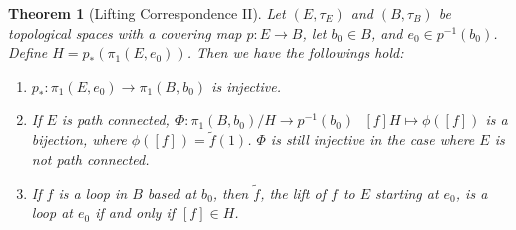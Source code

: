 \documentclass[11pt]{book}
\theoremstyle{break}
\theoremstyle{break}
\newtheorem{thm}{Theorem}[section]
\newcommand{\that}[1]{\widetilde{#1}}
\begin{document}
\begin{thm}[Lifting Correspondence II]
Let $(E,\tau_E)$ and $(B,\tau_B)$ be topological spaces with a covering map $p:E \to B$, let $b_0 \in B$, and $e_0 \in p^{-1}(b_0)$. Define $H = p_*(\pi_1(E,e_0))$. Then we have the followings hold:
\begin{enumerate}[topsep=3pt,itemsep=-1ex,partopsep=1ex,parsep=1ex]
\item $p_*:\pi_1(E,e_0) \to \pi_1(B,b_0)$ is injective.
\item If $E$ is path connected, $\Phi:\pi_1(B,b_0)/H \to p^{-1}(b_0) \ \ \ [f]H \mapsto \phi ([f])$ is a bijection, where $\phi([f]) = \that{f}(1)$. $\Phi$ is still injective in the case where $E$ is not path connected.
\item If $f$ is a loop in $B$ based at $b_0$, then $\that{f}$, the lift of $f$ to $E$ starting at $e_0$, is a loop at $e_0 $ if and only if $[f] \in H$. 
\end{enumerate}
\end{thm}
\end{document}

